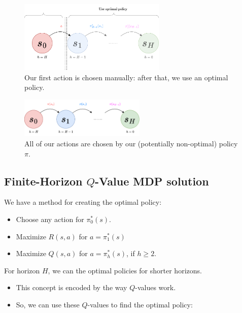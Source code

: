         \begin{figure}[H]
            \centering
            \includegraphics[width=70mm,scale=0.4]{images/mdp_images/q_value.png}
            \caption*{Our first action is chosen manually: after that, we use an optimal policy.}
        \end{figure}

        \begin{figure}[H]
            \centering
            \includegraphics[width=60mm,scale=0.4]{images/mdp_images/v_value.png}
            \caption*{All of our actions are chosen by our (potentially non-optimal) policy $\pi$.}
        \end{figure}

    \pagebreak

    \subsection{Finite-Horizon $Q$-Value MDP solution}

        We have a method for creating the optimal policy:

        \begin{itemize}
            \item Choose any action for $\pi_0^*(s)$.
            \item Maximize $R(s,a)$ for $a=\pi_1^*(s)$
            \item Maximize $Q(s,a)$ for $a=\pi_h^*(s)$, if $h\geq 2$.
        \end{itemize}

        For horizon $H$, we can  the optimal policies for shorter horizons.

            \begin{itemize}
                \item This concept is encoded by the way $Q$-values work.

                \item So, we can use these $Q$-values to find the optimal policy:
            \end{itemize}

